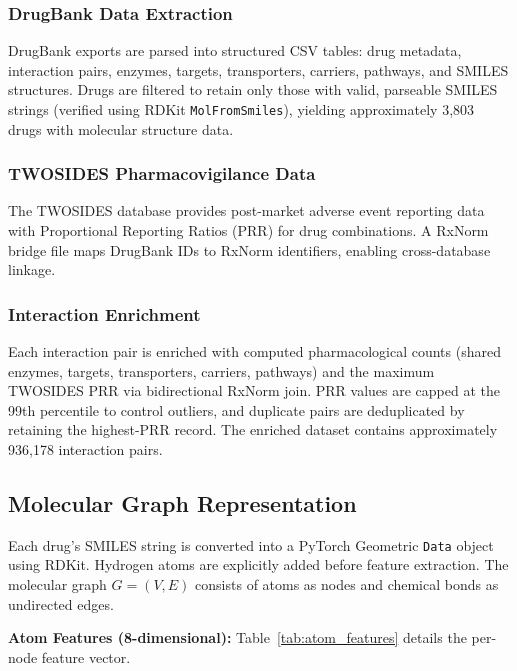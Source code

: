 \documentclass[conference]{IEEEtran}
\begin{document}
\subsubsection{DrugBank Data Extraction}
DrugBank \cite{wishart2018} exports are parsed into structured CSV tables: drug metadata, interaction pairs, enzymes, targets, transporters, carriers, pathways, and SMILES structures. Drugs are filtered to retain only those with valid, parseable SMILES strings (verified using RDKit \texttt{MolFromSmiles}), yielding approximately 3,803 drugs with molecular structure data.

\subsubsection{TWOSIDES Pharmacovigilance Data}
The TWOSIDES database \cite{tatonetti2012} provides post-market adverse event reporting data with Proportional Reporting Ratios (PRR) for drug combinations. A RxNorm bridge file maps DrugBank IDs to RxNorm identifiers, enabling cross-database linkage.

\subsubsection{Interaction Enrichment}
Each interaction pair is enriched with computed pharmacological counts (shared enzymes, targets, transporters, carriers, pathways) and the maximum TWOSIDES PRR via bidirectional RxNorm join. PRR values are capped at the 99th percentile to control outliers, and duplicate pairs are deduplicated by retaining the highest-PRR record. The enriched dataset contains approximately 936,178 interaction pairs.

\subsection{Molecular Graph Representation}
Each drug's SMILES string is converted into a PyTorch Geometric \texttt{Data} object using RDKit. Hydrogen atoms are explicitly added before feature extraction. The molecular graph $G = (V, E)$ consists of atoms as nodes and chemical bonds as undirected edges.

\textbf{Atom Features (8-dimensional):} Table~\ref{tab:atom_features} details the per-node feature vector.
\end{document}
